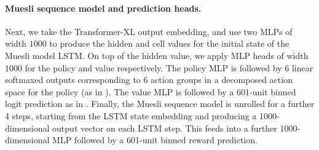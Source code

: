 \documentclass[11pt, a4paper, logo, copyright]{deepmind}
\begin{document}
\begin{appendix}
\paragraph{Muesli sequence model and prediction heads.}
Next, we take the Transformer-XL output embedding, and use two MLPs of width $1000$ to produce the hidden and cell values for the initial state of the Muesli model LSTM. On top of the hidden value, we apply MLP heads of width $1000$ for the policy and value respectively. The policy MLP is followed by 6 linear softmaxed outputs corresponding to 6 action groups in a decomposed action space for the policy (as in \citet{xland}). The value MLP is followed by a 601-unit binned logit prediction as in \citet{hessel2021muesli}. Finally, the Muesli sequence model is unrolled for a further 4 steps, starting from the LSTM state embedding and producing a 1000-dimensional output vector on each LSTM step. This feeds into a further 1000-dimensional MLP followed by a 601-unit binned reward prediction.

\end{appendix}
\end{document}
